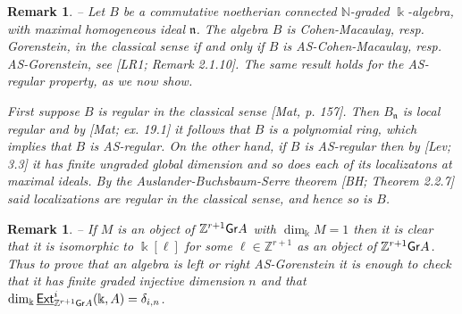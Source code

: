 \documentclass[twoside,11pt]{article}
\renewcommand{\k}{\Bbbk}
\newcommand{\N}{{\mathbb N}}
\newcommand{\Z}{{\mathbb Z}}
\newcommand{\n}{{\mathfrak n}}
\newcommand{\GrMod}{{\sf Gr}}
\newcommand{\EXT}{\underline{\sf Ext}}
\newtheorem{subremark}[subtheorem]{Remark}
\begin{document}
\begin{subremark} -- \rm
Let $B$ be a commutative noetherian connected $\N$-graded $\k$-algebra, with maximal
homogeneous ideal $\n$. The algebra $B$ is Cohen-Macaulay, resp. Gorenstein, in the
classical sense if and only if $B$ is AS-Cohen-Macaulay, resp. AS-Gorenstein, see [LR1;
Remark 2.1.10]. The same result holds for the AS-regular property, as we now show.

First suppose $B$ is regular in the classical sense [Mat, p. 157]. Then $B_\n$ is local
regular and by [Mat; ex. 19.1] it follows that $B$ is a polynomial ring, which implies
that $B$ is AS-regular. On the other hand, if $B$ is AS-regular then by [Lev; 3.3] it has
finite ungraded global dimension and so does each of its localizatons at maximal ideals.
By the Auslander-Buchsbaum-Serre theorem [BH; Theorem 2.2.7] said localizations are
regular in the classical sense, and hence so is $B$.
\end{subremark}

\begin{subremark} -- \rm
\label{one-dim}
If $M$ is an object of $\Z^{r+1}\GrMod A$ with $\dim_\k M = 1$ then it is clear that it is
isomorphic to $\k[\ell]$ for some $\ell \in \Z^{r+1}$ as an object of $\Z^{r+1}\GrMod A$.
Thus to prove that an algebra is left or right AS-Gorenstein it is enough to check that it
has finite graded injective dimension $n$ and that $\dim_\k \EXT_{\Z^{r+1}\GrMod A}^i(\k,
A) = \delta_{i,n}$.
\end{subremark}
\end{document}
